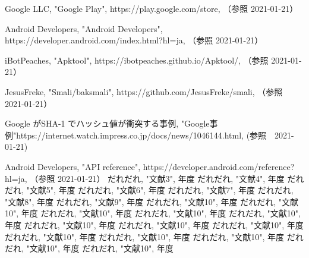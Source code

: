 \newpage
\begin{thebibliography}{99}

Google LLC, "Google Play", https://play.google.com/store, （参照 2021-01-21）

Android Developers, "Android Developers", https://developer.android.com/index.html?hl=ja, （参照 2021-01-21）

iBotPeaches, "Apktool", https://ibotpeaches.github.io/Apktool/, （参照 2021-01-21）

JesusFreke, "Smali/baksmali", https://github.com/JesusFreke/smali, （参照 2021-01-21）


Google がSHA-1 でハッシュ値が衝突する事例, "Google事例"https://internet.watch.impress.co.jp/docs/news/1046144.html, (参照　2021-01-21)

Android Developers, "API reference", https://developer.android.com/reference?hl=ja, （参照 2021-01-21）
だれだれ, "文献3", 年度
だれだれ, "文献4", 年度
だれだれ, "文献5", 年度
だれだれ, "文献6", 年度
だれだれ, "文献7", 年度
だれだれ, "文献8", 年度
だれだれ, "文献9", 年度
だれだれ, "文献10", 年度
だれだれ, "文献10", 年度
だれだれ, "文献10", 年度
だれだれ, "文献10", 年度
だれだれ, "文献10", 年度
だれだれ, "文献10", 年度
だれだれ, "文献10", 年度
だれだれ, "文献10", 年度
だれだれ, "文献10", 年度
だれだれ, "文献10", 年度
だれだれ, "文献10", 年度
だれだれ, "文献10", 年度
だれだれ, "文献10", 年度

\end{thebibliography}